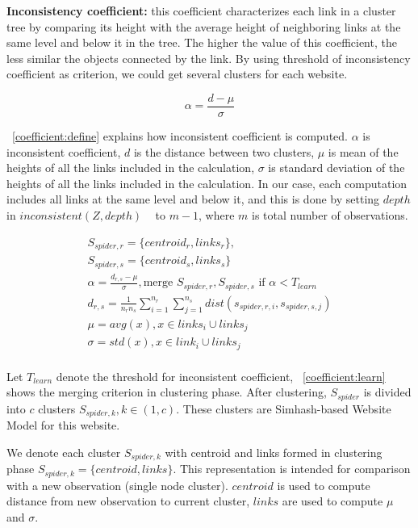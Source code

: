 {\bf Inconsistency coefficient:} this coefficient characterizes each link in a cluster tree by
comparing its height with the average height of neighboring links at the same
level and below it in the tree. The higher the value of this
coefficient, the less similar the
objects connected by the link. By using threshold of inconsistency
coefficient as criterion, we could get several clusters for each website.

\begin{equation}
  \label{coefficient:define}
  \alpha  = \frac{d - \mu}{\sigma}
\end{equation}

~\autoref{coefficient:define} explains how inconsistent coefficient is computed.
$\alpha$ is inconsistent coefficient, $d$ is the distance between two
clusters, $\mu$ is mean of the heights of all the links included in the
calculation, $\sigma$ is standard deviation of the heights of all the links
included in the calculation. In our case, each computation includes all links at
the same level and below it, and this is done by setting $depth$ in
$inconsistent(Z, depth)$ ~\cite{icintro} to $m-1$, where $m$ is total number of observations.

\begin{equation}
  \label{coefficient:learn}
  \begin{gathered}
    S_{spider, r} = \{centroid_r, links_r\}, \\
    S_{spider, s} = \{centroid_s, links_s\} \\
    \alpha = \frac{d_{r,s} - \mu}{\sigma}, \text{merge } S_{spider, r},
    S_{spider, s} \text{ if } \alpha < T_{learn} \\
    d_{r, s} = \frac{1}{n_rn_s}\sum_{i=1}^{n_r}\sum_{j=1}^{n_s} dist(s_{spider,
    r, i}, s_{spider, s, j}) \\ 
    \mu = avg(x), x \in  links_i \cup links_j \\
    \sigma = std(x), x \in link_i \cup links_j \\
  \end{gathered}
\end{equation}

Let $T_{learn}$ denote the threshold for inconsistent coefficient, 
~\autoref{coefficient:learn} shows the merging criterion in clustering phase.
After clustering, $S_{spider}$ is divided into $c$ clusters $S_{spider, k}, k \in (1, c)$.
These clusters are Simhash-based Website Model for this website.

We denote each cluster $S_{spider, k}$ with centroid and links formed in
clustering phase $S_{spider, k} = \{centroid, links\}$. This representation is
intended for comparison with a new observation (single node cluster). $centroid$ is used to
compute distance from new observation to current cluster, $links$ are used
to compute $\mu$ and $\sigma$.

